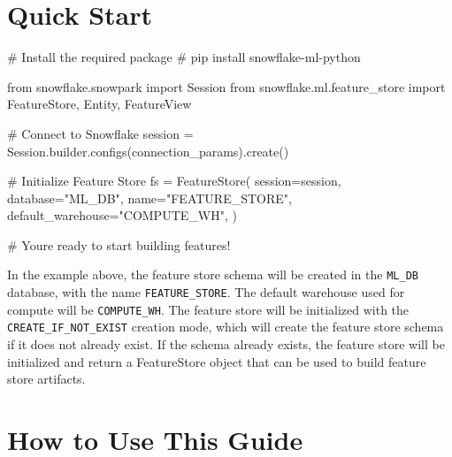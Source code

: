 \documentclass[
  letterpaper,
  DIV=11,
  numbers=noendperiod]{scrreprt}
\newenvironment{Shaded}{\begin{snugshade}}{\end{snugshade}}
\newcommand{\CommentTok}[1]{\textcolor[rgb]{0.37,0.37,0.37}{#1}}
\newcommand{\ImportTok}[1]{\textcolor[rgb]{0.00,0.46,0.62}{#1}}
\newcommand{\NormalTok}[1]{\textcolor[rgb]{0.00,0.23,0.31}{#1}}
\newcommand{\OperatorTok}[1]{\textcolor[rgb]{0.37,0.37,0.37}{#1}}
\newcommand{\StringTok}[1]{\textcolor[rgb]{0.13,0.47,0.30}{#1}}
\begin{document}
\hypertarget{quick-start}{%
\section*{Quick Start}\label{quick-start}}


\begin{Shaded}
\begin{Highlighting}[]
\CommentTok{\# Install the required package}
\CommentTok{\# pip install snowflake{-}ml{-}python}

\ImportTok{from}\NormalTok{ snowflake.snowpark }\ImportTok{import}\NormalTok{ Session}
\ImportTok{from}\NormalTok{ snowflake.ml.feature\_store }\ImportTok{import}\NormalTok{ FeatureStore, Entity, FeatureView}

\CommentTok{\# Connect to Snowflake}
\NormalTok{session }\OperatorTok{=}\NormalTok{ Session.builder.configs(connection\_params).create()}

\CommentTok{\# Initialize Feature Store}
\NormalTok{fs }\OperatorTok{=}\NormalTok{ FeatureStore(}
\NormalTok{    session}\OperatorTok{=}\NormalTok{session,}
\NormalTok{    database}\OperatorTok{=}\StringTok{"ML\_DB"}\NormalTok{,}
\NormalTok{    name}\OperatorTok{=}\StringTok{"FEATURE\_STORE"}\NormalTok{,}
\NormalTok{    default\_warehouse}\OperatorTok{=}\StringTok{"COMPUTE\_WH"}\NormalTok{,}
\NormalTok{)}

\CommentTok{\# You\textquotesingle{}re ready to start building features!}
\end{Highlighting}
\end{Shaded}

In the example above, the feature store schema will be created in the
\texttt{ML\_DB} database, with the name \texttt{FEATURE\_STORE}. The
default warehouse used for compute will be \texttt{COMPUTE\_WH}. The
feature store will be initialized with the
\texttt{CREATE\_IF\_NOT\_EXIST} creation mode, which will create the
feature store schema if it does not already exist. If the schema already
exists, the feature store will be initialized and return a FeatureStore
object that can be used to build feature store artifacts.

\hypertarget{how-to-use-this-guide}{%
\section*{How to Use This Guide}\label{how-to-use-this-guide}}
\end{document}
